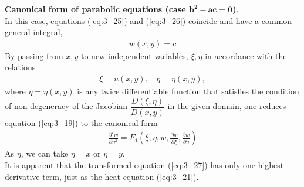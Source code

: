 \documentclass[11pt]{report}
\newcommand{\NI}{\noindent}
\newcommand{\sps}{\\[0.2cm]}
\newcommand{\refn}[1]{(\ref{#1})}
\newcommand{\refx}[1]{\refn{eq:#1}}
\newcommand{\bt}[1]{\textbf{#1}}
\begin{document}
	\NI\bt{Canonical form of parabolic equations (case $\mathbf{b^2-ac = 0}$)}.\\
	In this case, equations \refx{3_25} and \refx{3_26} coincide and have a common general integral,
	\begin{eqnarray*}
		w(x,y) = c
	\end{eqnarray*}
	By passing from $x,y$ to new independent variables, $\xi, \eta$ in accordance with the relations
	\begin{eqnarray*}
		\xi = u(x,y),~~~~ \eta = \eta(x,y),
	\end{eqnarray*}
	where $\eta=\eta(x,y)$ is any twice differentiable function that satisfies the condition of non-degeneracy of the Jacobian $\dfrac{D(\xi,\eta)}{D(x,y)}$ in the given domain, one reduces equation \refx{3_19} to the canonical form
	\begin{eqnarray}
		\frac{\partial^2 w}{\partial\eta^2} = F_1\left(\xi,\eta,w,\frac{\partial w}{\partial\xi}, \frac{\partial w}{\partial\eta}\right) \label{eq:3_27}
	\end{eqnarray}
	As $\eta$, we can take $\eta =x$ or $\eta=y$.\sps
	It is apparent that the transformed equation \refx{3_27} has only one highest derivative term, just as the heat equation
	\refx{3_21}.\sps
	
\end{document}
